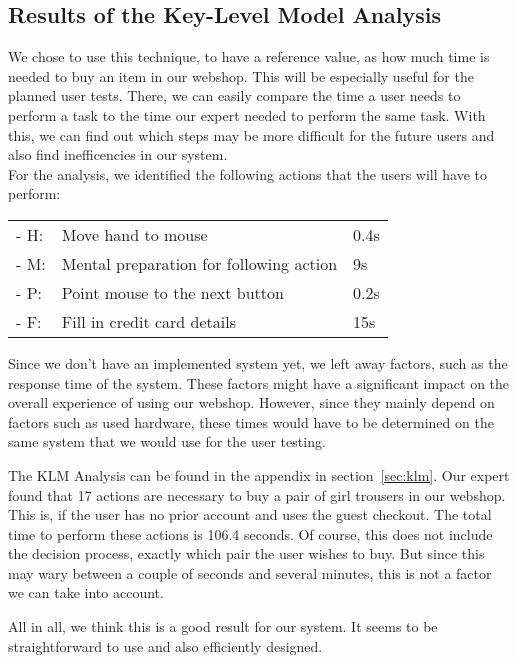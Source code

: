 \subsection{Results of the Key-Level Model Analysis}
We chose to use this technique, to have a reference value, as how much time is needed to buy an item in our webshop. This will be especially useful for the planned user tests. There, we can easily compare the time a user needs to perform a task to the time our expert needed to perform the same task. With this, we can find out which steps may be more difficult for the future users and also find inefficencies in our system.\\
For the analysis, we identified the following actions that the users will have to perform:\\
\begin{tabular}{l l l}
	\hspace{0.5cm}- H: & Move hand to mouse & 0.4s\\
	\hspace{0.5cm}- M: & Mental preparation for following action & 9s\\
	\hspace{0.5cm}- P: & Point mouse to the next button & 0.2s\\
	\hspace{0.5cm}- F: & Fill in credit card details & 15s\\
\end{tabular}

Since we don't have an implemented system yet, we left away factors, such as the response time of the system. These factors might have a significant impact on the overall experience of using our webshop. However, since they mainly depend on factors such as used hardware, these times would have to be determined on the same system that we would use for the user testing.

The KLM Analysis can be found in the appendix in section~\ref{sec:klm}.
Our expert found that 17 actions are necessary to buy a pair of girl trousers in our webshop. This is, if the user has no prior account and uses the guest checkout. The total time to perform these actions is 106.4 seconds. Of course, this does not include the decision process, exactly which pair the user wishes to buy. But since this may wary between a couple of seconds and several minutes, this is not a factor we can take into account.

All in all, we think this is a good result for our system. It seems to be straightforward to use and also efficiently designed.